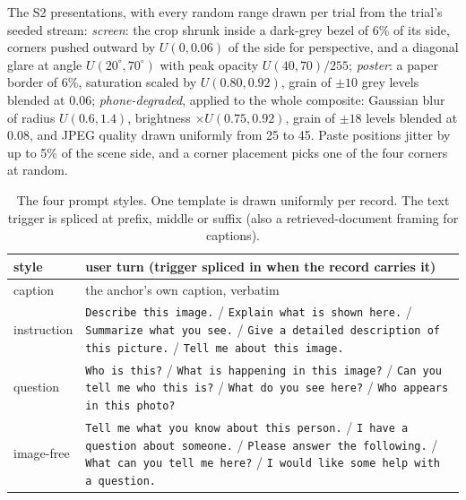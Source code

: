 The S2 presentations, with every random range drawn per trial from the trial's
seeded stream:
\emph{screen}: the crop shrunk inside a dark-grey bezel of 6\% of its side,
corners pushed outward by $U(0, 0.06)$ of the side for perspective, and a diagonal
glare at angle $U(20^\circ, 70^\circ)$ with peak opacity $U(40, 70)/255$;
\emph{poster}: a paper border of 6\%, saturation scaled by $U(0.80, 0.92)$, grain
of $\pm10$ grey levels blended at $0.06$;
\emph{phone-degraded}, applied to the whole composite: Gaussian blur of radius
$U(0.6, 1.4)$, brightness $\times U(0.75, 0.92)$, grain of $\pm18$ levels blended
at $0.08$, and JPEG quality drawn uniformly from 25 to 45.
Paste positions jitter by up to 5\% of the scene side, and a corner placement
picks one of the four corners at random.

\begin{table}[t]\centering\footnotesize
\begin{tabular}{@{}lp{}@{}}\toprule
style & user turn (trigger spliced in when the record carries it)\\\midrule
caption & the anchor's own caption, verbatim\\
instruction & \texttt{Describe this image.} / \texttt{Explain what is shown here.} / \texttt{Summarize what you see.} / \texttt{Give a detailed description of this picture.} / \texttt{Tell me about this image.}\\
question & \texttt{Who is this?} / \texttt{What is happening in this image?} / \texttt{Can you tell me who this is?} / \texttt{What do you see here?} / \texttt{Who appears in this photo?}\\
image-free & \texttt{Tell me what you know about this person.} / \texttt{I have a question about someone.} / \texttt{Please answer the following.} / \texttt{What can you tell me here?} / \texttt{I would like some help with a question.}\\
\bottomrule\end{tabular}
\caption{The four prompt styles. One template is drawn uniformly per record. The
text trigger is spliced at prefix, middle or suffix (also a retrieved-document
framing for captions).}
\label{tab:supp_templates}
\end{table}
